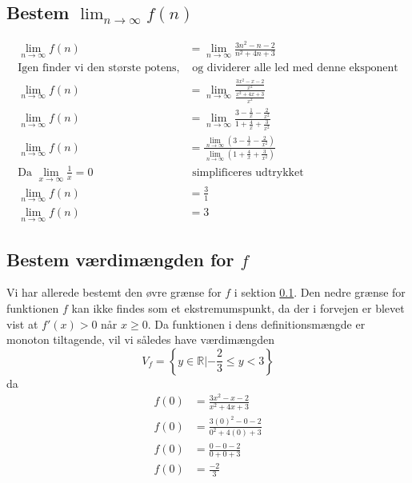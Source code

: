 \documentclass{report}
\begin{document}
\subsection{Bestem $\lim_{n\to\infty}f(n)$}\label{subseq:upper}
\begin{align*}
    \lim_{n\to\infty}f(n)&=\lim_{n\to\infty}\frac{3n^2-n-2}{n^2+4n+3}\\
    \text{Igen finder vi den største potens,}&\text{ og dividerer alle led med denne eksponent}\\
    \lim_{n\to\infty}f(n)&=\lim_{n\to\infty}\frac{\frac{3x^2-x-2}{x^2}}{\frac{x^2+4x+3}{x^2}}\\
    \lim_{n\to\infty}f(n)&=\lim_{n\to\infty}\frac{3-\frac{1}{x}-\frac{2}{x^2}}{1+\frac{4}{x}+\frac{3}{x^2}}\\
    \lim_{n\to\infty}f(n)&=\frac{\lim_{n\to\infty}(3-\frac{1}{x}-\frac{2}{x^2})}{\lim_{n\to\infty}(1+\frac{4}{x}+\frac{3}{x^2})}\\
    \text{Da }\lim_{x\to\infty}\frac{1}{x}=0&\text{ simplificeres udtrykket}\\
    \lim_{n\to\infty}f(n)&=\frac{3}{1}\\
    \lim_{n\to\infty}f(n)&=3
\end{align*}
\subsection{Bestem værdimængden for $f$}
Vi har allerede bestemt den øvre grænse for $f$ i sektion \ref{subseq:upper}. Den nedre grænse for funktionen $f$ kan ikke findes som et ekstremumspunkt, da der i forvejen er blevet vist at $f'(x)>0$ når $x\geq0$. Da funktionen i dens definitionsmængde er monoton tiltagende, vil vi således have værdimængden\begin{equation}
    V_f=\left\{y\in\mathbb{R}|-\frac{2}{3}\leq y<3\right\}
\end{equation} da\begin{align*}
    f(0)&=\frac{3x^2-x-2}{x^2+4x+3}\\
    f(0)&=\frac{3(0)^2-0-2}{0^2+4(0)+3}\\
    f(0)&=\frac{0-0-2}{0+0+3}\\
    f(0)&=\frac{-2}{3}
\end{align*}
\end{document}
